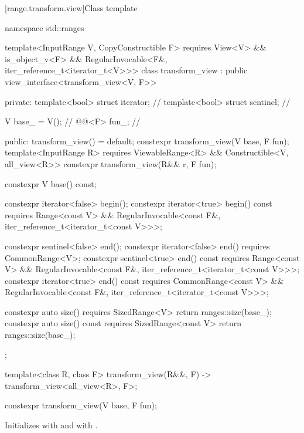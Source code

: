 [range.transform.view]{Class template }

\begin{codeblock}
namespace std::ranges {
  template<InputRange V, CopyConstructible F>
    requires View<V> && is_object_v<F> &&
             RegularInvocable<F&, iter_reference_t<iterator_t<V>>>
  class transform_view : public view_interface<transform_view<V, F>> {
  private:
    template<bool> struct iterator;             // \expos
    template<bool> struct sentinel;             // \expos

    V base_ = V();                              // \expos
    @@<F> fun_;                        // \expos

  public:
    transform_view() = default;
    constexpr transform_view(V base, F fun);
    template<InputRange R>
      requires ViewableRange<R> && Constructible<V, all_view<R>>
    constexpr transform_view(R&& r, F fun);

    constexpr V base() const;

    constexpr iterator<false> begin();
    constexpr iterator<true> begin() const
      requires Range<const V> &&
               RegularInvocable<const F&, iter_reference_t<iterator_t<const V>>>;

    constexpr sentinel<false> end();
    constexpr iterator<false> end() requires CommonRange<V>;
    constexpr sentinel<true> end() const
      requires Range<const V> &&
               RegularInvocable<const F&, iter_reference_t<iterator_t<const V>>>;
    constexpr iterator<true> end() const
      requires CommonRange<const V> &&
               RegularInvocable<const F&, iter_reference_t<iterator_t<const V>>>;

    constexpr auto size() requires SizedRange<V> { return ranges::size(base_); }
    constexpr auto size() const requires SizedRange<const V>
    { return ranges::size(base_); }
  };

  template<class R, class F>
    transform_view(R&&, F) -> transform_view<all_view<R>, F>;
}
\end{codeblock}

%
\begin{itemdecl}
constexpr transform_view(V base, F fun);
\end{itemdecl}

\begin{itemdescr}
\pnum
\effects Initializes  with  and
 with .
\end{itemdescr}

